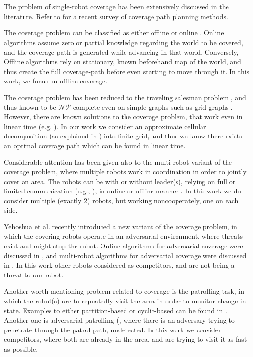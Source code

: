The problem of single-robot coverage has been extensively discussed in the literature. Refer to \cite{galceran2013survey} for a recent survey of coverage path planning methods.

The coverage problem can be classified as either offline or online \cite{choset2001coverage}.
Online algorithms assume zero or partial knowledge regarding the world to be covered, and the coverage-path is generated while advancing in that world. Conversely, Offline algorithms rely on stationary, known beforehand map of the world, and thus create the full coverage-path before even starting to move through it. In this work, we focus on offline coverage.

The coverage problem has been reduced to the traveling salesman problem \cite{arkin2000approximation}, and thus known to be $\mathcal{NP}$-complete even on simple graphs such as grid graphs \cite{papadimitriou1977euclidean}. However, there are known solutions to the coverage problem, that work even in linear time (e.g. \cite{gabriely2001spanning}). In our work we consider an approximate cellular decomposition (as explained in \cite{galceran2013survey}) into finite grid, and thus we know there exists an optimal coverage path which can be found in linear time.

Considerable attention has been given also to the multi-robot variant of the coverage problem, where multiple robots work in coordination in order to jointly cover an area. The robots can be with or without leader(s), relying on full or limited communication (e.g., \cite{agmon2008giving}), in online or offline manner \cite{agmon2008giving, de2005blind}.
In this work we do consider multiple (exactly 2) robots, but working noncooperately, one on each side.

Yehoshua et al. \cite{yehoshua2013robotic} recently introduced a new variant of the coverage problem, in which the covering robots operate in an adversarial environment, where threats exist and might stop the robot. Online algorithms for adversarial coverage were discussed in  \cite{yehoshua2015online}, and multi-robot algorithms for adversarial coverage were discussed in \cite{yehoshua2016multi}. 
In this work other robots considered as competitors, and are not being a threat to our robot.

Another worth-mentioning problem related to coverage is the patrolling task, in which the robot(s) are to repeatedly visit the area in order to monitor change in state. Examples to either partition-based or cyclic-based can be found in \cite{guo2004towards, guo2004coverage, jung2002tracking, chevaleyre2004theoretical}.
Another one is adversarial patrolling (\cite{agmon2011multi, sless2014multi, agmon2008multi}, where there is an adversary trying to penetrate through the patrol path, undetected. In this work we consider competitors, where both are already in the area, and are trying to visit it as fast as possible.

